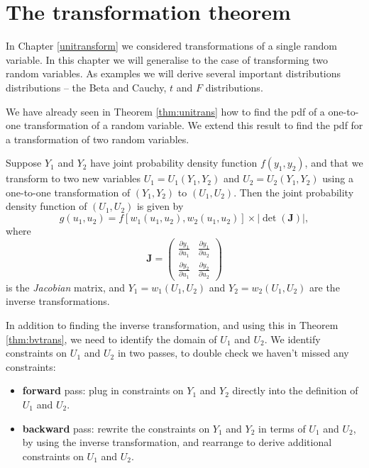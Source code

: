\documentclass[]{book}
\providecommand{\tightlist}{%
  \setlength{\itemsep}{0pt}\setlength{\parskip}{0pt}}
\theoremstyle{definition}
\theoremstyle{definition}
\theoremstyle{definition}
\theoremstyle{remark}
\let\BeginKnitrBlock\begin \let\EndKnitrBlock\end
\begin{document}
\section{The transformation theorem}\label{the-transformation-theorem}

In Chapter \ref{unitransform} we considered transformations of a single
random variable. In this chapter we will generalise to the case of
transforming two random variables. As examples we will derive several
important distributions distributions -- the Beta and Cauchy, \(t\) and
\(F\) distributions.

We have already seen in Theorem \ref{thm:unitrans} how to find the pdf
of a one-to-one transformation of a random variable. We extend this
result to find the pdf for a transformation of two random variables.

\BeginKnitrBlock{theorem}
\protect\hypertarget{thm:bvtrans}{}{\label{thm:bvtrans} }Suppose \(Y_1\) and
\(Y_2\) have joint probability density function \(f(y_1, y_2)\), and
that we transform to two new variables \(U_1 = U_1(Y_1, Y_2)\) and
\(U_2 = U_2(Y_1, Y_2)\) using a one-to-one transformation of
\((Y_1 , Y_2)\) to \((U_1, U_2)\). Then the joint probability density
function of \((U_1, U_2)\) is given by
\[g(u_1 , u_2)  = f[w_1(u_1, u_2), w_2(u_1 , u_2)] \times \big|\det (\bm J)\big|,\]
where \[ \bm{J} = 
\begin{pmatrix}
\frac{\partial y_1}{\partial u_1} & \frac{\partial y_1}{\partial u_2} \\
\frac{\partial y_2}{\partial u_1} & \frac{\partial y_2}{\partial u_2}
\end{pmatrix}
\] is the \emph{Jacobian} matrix, and \(Y_1 = w_1(U_1, U_2)\) and
\(Y_2 = w_2(U_1, U_2)\) are the inverse transformations.
\EndKnitrBlock{theorem}

In addition to finding the inverse transformation, and using this in
Theorem \ref{thm:bvtrans}, we need to identify the domain of \(U_1\) and
\(U_2\). We identify constraints on \(U_1\) and \(U_2\) in two passes,
to double check we haven't missed any constraints:

\begin{itemize}
\tightlist
\item
  \textbf{forward} pass: plug in constraints on \(Y_1\) and \(Y_2\)
  directly into the definition of \(U_1\) and \(U_2\).
\item
  \textbf{backward} pass: rewrite the constraints on \(Y_1\) and \(Y_2\)
  in terms of \(U_1\) and \(U_2\), by using the inverse transformation,
  and rearrange to derive additional constraints on \(U_1\) and \(U_2\).
\end{itemize}
\end{document}
